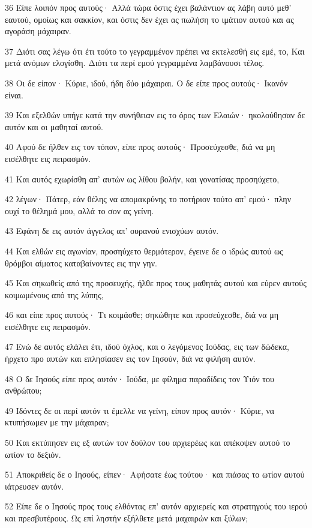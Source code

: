 \par 36 Είπε λοιπόν προς αυτούς· Αλλά τώρα όστις έχει βαλάντιον ας λάβη αυτό μεθ' εαυτού, ομοίως και σακκίον, και όστις δεν έχει ας πωλήση το ιμάτιον αυτού και ας αγοράση μάχαιραν.
\par 37 Διότι σας λέγω ότι έτι τούτο το γεγραμμένον πρέπει να εκτελεσθή εις εμέ, το, Και μετά ανόμων ελογίσθη. Διότι τα περί εμού γεγραμμένα λαμβάνουσι τέλος.
\par 38 Οι δε είπον· Κύριε, ιδού, ήδη δύο μάχαιραι. Ο δε είπε προς αυτούς· Ικανόν είναι.
\par 39 Και εξελθών υπήγε κατά την συνήθειαν εις το όρος των Ελαιών· ηκολούθησαν δε αυτόν και οι μαθηταί αυτού.
\par 40 Αφού δε ήλθεν εις τον τόπον, είπε προς αυτούς· Προσεύχεσθε, διά να μη εισέλθητε εις πειρασμόν.
\par 41 Και αυτός εχωρίσθη απ' αυτών ως λίθου βολήν, και γονατίσας προσηύχετο,
\par 42 λέγων· Πάτερ, εάν θέλης να απομακρύνης το ποτήριον τούτο απ' εμού· πλην ουχί το θέλημά μου, αλλά το σον ας γείνη.
\par 43 Εφάνη δε εις αυτόν άγγελος απ' ουρανού ενισχύων αυτόν.
\par 44 Και ελθών εις αγωνίαν, προσηύχετο θερμότερον, έγεινε δε ο ιδρώς αυτού ως θρόμβοι αίματος καταβαίνοντες εις την γην.
\par 45 Και σηκωθείς από της προσευχής, ήλθε προς τους μαθητάς αυτού και εύρεν αυτούς κοιμωμένους από της λύπης,
\par 46 και είπε προς αυτούς· Τι κοιμάσθε; σηκώθητε και προσεύχεσθε, διά να μη εισέλθητε εις πειρασμόν.
\par 47 Ενώ δε αυτός ελάλει έτι, ιδού όχλος, και ο λεγόμενος Ιούδας, εις των δώδεκα, ήρχετο προ αυτών και επλησίασεν εις τον Ιησούν, διά να φιλήση αυτόν.
\par 48 Ο δε Ιησούς είπε προς αυτόν· Ιούδα, με φίλημα παραδίδεις τον Υιόν του ανθρώπου;
\par 49 Ιδόντες δε οι περί αυτόν τι έμελλε να γείνη, είπον προς αυτόν· Κύριε, να κτυπήσωμεν με την μάχαιραν;
\par 50 Και εκτύπησεν εις εξ αυτών τον δούλον του αρχιερέως και απέκοψεν αυτού το ωτίον το δεξιόν.
\par 51 Αποκριθείς δε ο Ιησούς, είπεν· Αφήσατε έως τούτου· και πιάσας το ωτίον αυτού ιάτρευσεν αυτόν.
\par 52 Είπε δε ο Ιησούς προς τους ελθόντας επ' αυτόν αρχιερείς και στρατηγούς του ιερού και πρεσβυτέρους. Ως επί ληστήν εξήλθετε μετά μαχαιρών και ξύλων;
